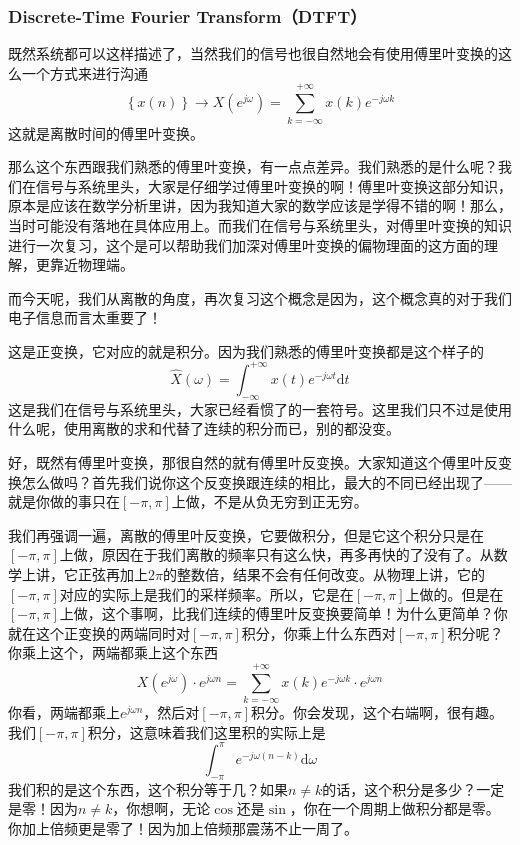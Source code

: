 \documentclass[a4paper,12pt]{article}
\begin{document}
\subsubsection{Discrete-Time Fourier Transform（DTFT）}\quad

既然系统都可以这样描述了，当然我们的信号也很自然地会有使用傅里叶变换的这么一个方式来进行沟通
\begin{equation}
    \left \{ x\left (  n\right )  \right \} \longrightarrow X\left (  e^{j\omega}\right )   = \sum_{k=-\infty}^{+\infty}x(k)e^{-j\omega k}
\end{equation}
这就是离散时间的傅里叶变换。

那么这个东西跟我们熟悉的傅里叶变换，有一点点差异。我们熟悉的是什么呢？我们在信号与系统里头，大家是仔细学过傅里叶变换的啊！傅里叶变换这部分知识，原本是应该在数学分析里讲，因为我知道大家的数学应该是学得不错的啊！那么，当时可能没有落地在具体应用上。而我们在信号与系统里头，对傅里叶变换的知识进行一次复习，这个是可以帮助我们加深对傅里叶变换的偏物理面的这方面的理解，更靠近物理端。

而今天呢，我们从离散的角度，再次复习这个概念是因为，这个概念真的对于我们电子信息而言太重要了！

这是正变换，它对应的就是积分。因为我们熟悉的傅里叶变换都是这个样子的
\begin{equation}
    \hat{X}\left (  \omega \right )   = \int_{-\infty}^{+\infty}x(t)e^{-j\omega t}\text{d}t
\end{equation}
这是我们在信号与系统里头，大家已经看惯了的一套符号。这里我们只不过是使用什么呢，使用离散的求和代替了连续的积分而已，别的都没变。

好，既然有傅里叶变换，那很自然的就有傅里叶反变换。大家知道这个傅里叶反变换怎么做吗？首先我们说你这个反变换跟连续的相比，最大的不同已经出现了——就是你做的事只在$\left [-\pi ,\pi \right ]$上做，不是从负无穷到正无穷。

我们再强调一遍，离散的傅里叶反变换，它要做积分，但是它这个积分只是在$\left [-\pi ,\pi \right ]$上做，原因在于我们离散的频率只有这么快，再多再快的了没有了。从数学上讲，它正弦再加上$2\pi$的整数倍，结果不会有任何改变。从物理上讲，它的$\left [-\pi ,\pi \right ]$对应的实际上是我们的采样频率。所以，它是在$\left [-\pi ,\pi \right ]$上做的。但是在$\left [-\pi ,\pi \right ]$上做，这个事啊，比我们连续的傅里叶反变换要简单！为什么更简单？你就在这个正变换的两端同时对$\left [-\pi ,\pi \right ]$积分，你乘上什么东西对$\left [-\pi ,\pi \right ]$积分呢？你乘上这个，两端都乘上这个东西
\begin{equation}
    X\left (  e^{j\omega}\right )  \cdot e^{j\omega n} = \sum_{k=-\infty}^{+\infty}x(k)e^{-j\omega k}\cdot e^{j\omega n}
\end{equation}
你看，两端都乘上$e^{j\omega n}$，然后对$\left [-\pi ,\pi \right ]$积分。你会发现，这个右端啊，很有趣。我们$\left [-\pi ,\pi \right ]$积分，这意味着我们这里积的实际上是
\begin{equation}
    \int_{-\pi}^{\pi}e^{-j\omega \left (n-k\right)}\text{d}\omega
\end{equation}
我们积的是这个东西，这个积分等于几？如果$n\neq k$的话，这个积分是多少？一定是零！因为$n\neq k$，你想啊，无论$\cos$还是$\sin$，你在一个周期上做积分都是零。你加上倍频更是零了！因为加上倍频那震荡不止一周了。
\end{document}
